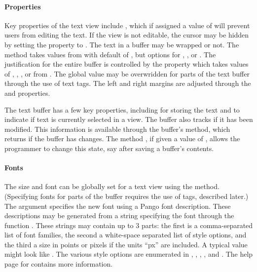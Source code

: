 \paragraph{Properties}
Key properties of the text view include , which if assigned
a value of  will prevent users from editing the text. 
If the view is not editable, the cursor may be hidden by setting the
 property to . 
The text in a buffer may be wrapped or not. The method 
takes values from  with default of , but
options for , , or . The
justification for the entire buffer is controlled by the
 property which takes values of ,
, , or  from .
The global value may be overwridden for parts of the text buffer
through the use of text tags. The left and right margins are adjusted
through the  and  properties. 

The text buffer has a few key properties, including  for
storing the text and  to indicate if text is
currently selected in a view. The buffer also tracks if it has been
modified. This information is available through the buffer's
 method, which returns 
if the buffer has changes. The method
, if given a value of ,
allows the programmer to change this state, say after saving a
buffer's contents.


\paragraph{Fonts}
The size and font can be globally set for a text view using the
 method. (Specifying fonts for parts of
the buffer requires the use of tags, described later.) The argument
 specifies the new font using
a Pango font description. These descriptions may be generated from a
string specifying the font through the function
. These strings may contain up to
3 parts: the first is a comma-separated list of font families, the
second a white-space separated list of style options, and the third a
size in points or pixels if the units ``px'' are included. A typical
value might look like . The various style options are enumerated in ,
, , , and
. The help page for 
contains more information.


